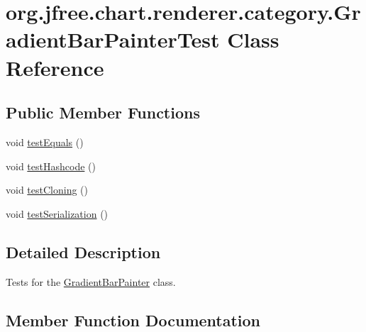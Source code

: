 \hypertarget{classorg_1_1jfree_1_1chart_1_1renderer_1_1category_1_1_gradient_bar_painter_test}{}\section{org.\+jfree.\+chart.\+renderer.\+category.\+Gradient\+Bar\+Painter\+Test Class Reference}
\label{classorg_1_1jfree_1_1chart_1_1renderer_1_1category_1_1_gradient_bar_painter_test}
\subsection*{Public Member Functions}
\begin{DoxyCompactItemize}
\item 
void \mbox{\hyperlink{classorg_1_1jfree_1_1chart_1_1renderer_1_1category_1_1_gradient_bar_painter_test_a3311948807af6e958fc525573551150e}{test\+Equals}} ()
\item 
void \mbox{\hyperlink{classorg_1_1jfree_1_1chart_1_1renderer_1_1category_1_1_gradient_bar_painter_test_a536f844c1bb70f0c8c5c3256c090c64a}{test\+Hashcode}} ()
\item 
void \mbox{\hyperlink{classorg_1_1jfree_1_1chart_1_1renderer_1_1category_1_1_gradient_bar_painter_test_a94bcba57e41d953da75d057808ae8a1d}{test\+Cloning}} ()
\item 
void \mbox{\hyperlink{classorg_1_1jfree_1_1chart_1_1renderer_1_1category_1_1_gradient_bar_painter_test_a53e22f7177caaa5be20647631882bade}{test\+Serialization}} ()
\end{DoxyCompactItemize}


\subsection{Detailed Description}
Tests for the \mbox{\hyperlink{classorg_1_1jfree_1_1chart_1_1renderer_1_1category_1_1_gradient_bar_painter}{Gradient\+Bar\+Painter}} class. 

\subsection{Member Function Documentation}
\mbox{\label{classorg_1_1jfree_1_1chart_1_1renderer_1_1category_1_1_gradient_bar_painter_test_a94bcba57e41d953da75d057808ae8a1d}} 
